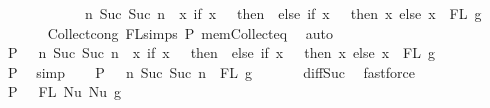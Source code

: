 \begin{isabellebody}
\ \ \ \ \ \ \ \ \ \ \ \ {\isacharbraceleft}{\kern0pt}n{\isachardot}{\kern0pt}\ Suc\ {\isacharparenleft}{\kern0pt}Suc\ n{\isacharparenright}{\kern0pt}\ {\isasymin}\ {\isacharparenleft}{\kern0pt}{\isasymlambda}x{\isachardot}{\kern0pt}\ if\ x\ {\isacharequal}{\kern0pt}\ {}\ then\ {}\ else\ if\ x\ {\isacharequal}{\kern0pt}\ {}\ then\ x\ else\ x{\isacharparenright}{\kern0pt}\ {\isacharbackquote}{\kern0pt}\ FL\ g{\isacharbraceright}{\kern0pt}{\isachardoublequoteclose}\isanewline
\ \ \ \ \ \isamarkupfalse%
\ Collect{\isacharunderscore}{\kern0pt}cong\ FL{\isachardot}{\kern0pt}simps{\isacharparenleft}{\kern0pt}{}{\isacharparenright}{\kern0pt}\ P{}\ mem{\isacharunderscore}{\kern0pt}Collect{\isacharunderscore}{\kern0pt}eq\ \isamarkupfalse%
\ auto\isanewline
\ \ \isamarkupfalse%
\ P{}{\isacharcolon}{\kern0pt}\ {\isachardoublequoteopen}{\isachardot}{\kern0pt}{\isachardot}{\kern0pt}{\isachardot}{\kern0pt}\ {\isacharequal}{\kern0pt}\ {\isacharbraceleft}{\kern0pt}n{\isachardot}{\kern0pt}\ Suc\ {\isacharparenleft}{\kern0pt}Suc\ n{\isacharparenright}{\kern0pt}\ {\isasymin}\ {\isacharparenleft}{\kern0pt}{\isasymlambda}x{\isachardot}{\kern0pt}\ if\ x\ {\isacharequal}{\kern0pt}\ {}\ then\ {}\ else\ if\ x\ {\isacharequal}{\kern0pt}\ {}\ then\ x\ else\ x{\isacharparenright}{\kern0pt}\ {\isacharbackquote}{\kern0pt}\ FL\ g{\isacharbraceright}{\kern0pt}{\isachardoublequoteclose}\isanewline
\ \ \ \ \ \ \isamarkupfalse%
\ P{}\ \isamarkupfalse%
\ simp\isanewline
\ \ \isamarkupfalse%
\ P{}{\isacharcolon}{\kern0pt}\ {\isachardoublequoteopen}{\isachardot}{\kern0pt}{\isachardot}{\kern0pt}{\isachardot}{\kern0pt}\ {\isacharequal}{\kern0pt}\ {\isacharbraceleft}{\kern0pt}n{\isachardot}{\kern0pt}\ Suc\ {\isacharparenleft}{\kern0pt}Suc\ n{\isacharparenright}{\kern0pt}\ {\isasymin}\ FL\ g{\isacharbraceright}{\kern0pt}{\isachardoublequoteclose}\isanewline
\ \ \ \ \ \isamarkupfalse%
\ diff{\isacharunderscore}{\kern0pt}Suc{\isacharunderscore}{\kern0pt}{}{\isacharprime}{\kern0pt}\ \isamarkupfalse%
\ fastforce\isanewline
\ \ \isamarkupfalse%
\ P{}{\isacharcolon}{\kern0pt}\ {\isachardoublequoteopen}{\isachardot}{\kern0pt}{\isachardot}{\kern0pt}{\isachardot}{\kern0pt}\ {\isacharequal}{\kern0pt}\ FL\ {\isacharparenleft}{\kern0pt}Nu\ {\isacharparenleft}{\kern0pt}Nu\ g{\isacharparenright}{\kern0pt}{\isacharparenright}{\kern0pt}{\isachardoublequoteclose}\isanewline

\end{isabellebody}
